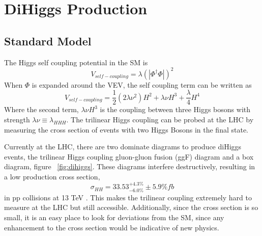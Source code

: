 \chapter{DiHiggs Production}

\section{Standard Model}
The Higgs self coupling potential in the SM is
\begin{equation}
V_{self-coupling} = \lambda(|\Phi^{\dagger}\Phi|)^{2}
\end{equation}
When ${\Phi}$ is expanded around the VEV, the self coupling term can be written as
\begin{equation}
V_{self-coupling} = \frac{1}{2}(2\lambda\nu^{2})H^{2} + \lambda\nu H^{3} + \frac{\lambda}{4}H^{4}
\end{equation}
Where the second term, ${\lambda\nu H^{3}}$ is the coupling between three Higgs bosons with strength ${\lambda\nu \equiv \lambda_{HHH}}$\cite{Belusevic:2004pz}. The trilinear Higgs coupling can be probed at the LHC by measuring the cross section of events with two Higgs Bosons in the final state.\linebreak



\indent  Currently at the LHC, there are two dominate diagrams to produce diHiggs events, the trilinear Higgs coupling gluon-gluon fusion (ggF) diagram and a box diagram, figure ~\ref{fig:dihiggs}. These diagrams interfere destructively, resulting in a low production cross section, 
\begin{equation}
\sigma_{HH} = 33.53^{+4.3\%}_{-6.0\%}\pm{5.9\%} fb
\end{equation}
in pp collisions at 13 TeV \cite{Sirunyan:2018two}. This makes the trilinear coupling extremely hard to measure at the LHC but still accessible. Additionally, since the cross section is so small, it is an easy place to look for deviations from the SM, since any enhancement to the cross section would be indicative of new physics.


